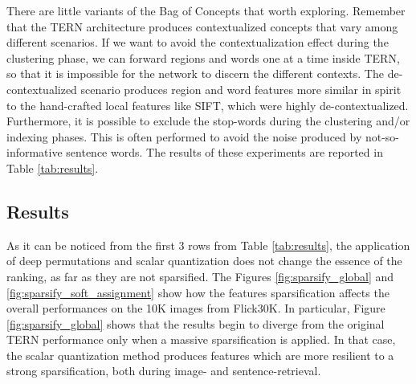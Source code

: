 \documentclass[conference]{IEEEtran}
\begin{document}
There are little variants of the Bag of Concepts that worth exploring.
Remember that the TERN architecture produces contextualized concepts that vary among different scenarios. If we want to avoid the contextualization effect during the clustering phase, we can forward regions and words one at a time inside TERN, so that it is impossible for the network to discern the different contexts. The de-contextualized scenario produces region and word features more similar in spirit to the hand-crafted local features like SIFT, which were highly de-contextualized. 
Furthermore, it is possible to exclude the stop-words during the clustering and/or indexing phases. This is often performed to avoid the noise produced by not-so-informative sentence words. The results of these experiments are reported in Table \ref{tab:results}. 



\subsection*{Results}

As it can be noticed from the first 3 rows from Table \ref{tab:results}, the application of deep permutations and scalar quantization does not change the essence of the ranking, as far as they are not sparsified. The Figures \ref{fig:sparsify_global} and \ref{fig:sparsify_soft_assignment} show how the features sparsification affects the overall performances on the 10K images from Flick30K. In particular, Figure \ref{fig:sparsify_global} shows that the results begin to diverge from the original TERN performance only when a massive sparsification is applied. In that case, the scalar quantization method produces features which are more resilient to a strong sparsification, both during image- and sentence-retrieval. %
\end{document}
